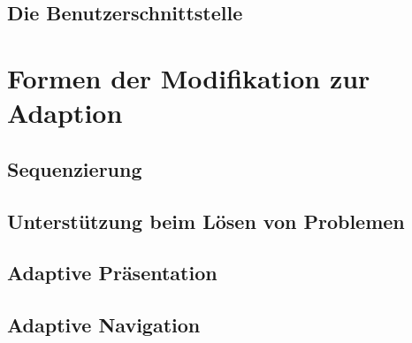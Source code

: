 \subsection{Die Benutzerschnittstelle}
\section{Formen der Modifikation zur Adaption}
\subsection{Sequenzierung}

\subsection{Unterstützung beim Lösen von Problemen}

\subsection{Adaptive Präsentation}

\subsection{Adaptive Navigation}
